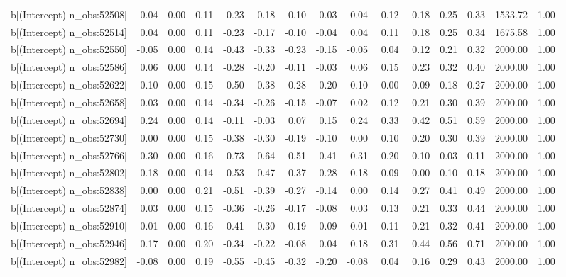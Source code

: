 \begin{table}[ht]
\begin{tabular}{rrrrrrrrrrrrrrr}
  b[(Intercept) n\_obs:52508] & 0.04 & 0.00 & 0.11 & -0.23 & -0.18 & -0.10 & -0.03 & 0.04 & 0.12 & 0.18 & 0.25 & 0.33 & 1533.72 & 1.00 \\ 
  b[(Intercept) n\_obs:52514] & 0.04 & 0.00 & 0.11 & -0.23 & -0.17 & -0.10 & -0.04 & 0.04 & 0.11 & 0.18 & 0.25 & 0.34 & 1675.58 & 1.00 \\ 
  b[(Intercept) n\_obs:52550] & -0.05 & 0.00 & 0.14 & -0.43 & -0.33 & -0.23 & -0.15 & -0.05 & 0.04 & 0.12 & 0.21 & 0.32 & 2000.00 & 1.00 \\ 
  b[(Intercept) n\_obs:52586] & 0.06 & 0.00 & 0.14 & -0.28 & -0.20 & -0.11 & -0.03 & 0.06 & 0.15 & 0.23 & 0.32 & 0.40 & 2000.00 & 1.00 \\ 
  b[(Intercept) n\_obs:52622] & -0.10 & 0.00 & 0.15 & -0.50 & -0.38 & -0.28 & -0.20 & -0.10 & -0.00 & 0.09 & 0.18 & 0.27 & 2000.00 & 1.00 \\ 
  b[(Intercept) n\_obs:52658] & 0.03 & 0.00 & 0.14 & -0.34 & -0.26 & -0.15 & -0.07 & 0.02 & 0.12 & 0.21 & 0.30 & 0.39 & 2000.00 & 1.00 \\ 
  b[(Intercept) n\_obs:52694] & 0.24 & 0.00 & 0.14 & -0.11 & -0.03 & 0.07 & 0.15 & 0.24 & 0.33 & 0.42 & 0.51 & 0.59 & 2000.00 & 1.00 \\ 
  b[(Intercept) n\_obs:52730] & 0.00 & 0.00 & 0.15 & -0.38 & -0.30 & -0.19 & -0.10 & 0.00 & 0.10 & 0.20 & 0.30 & 0.39 & 2000.00 & 1.00 \\ 
  b[(Intercept) n\_obs:52766] & -0.30 & 0.00 & 0.16 & -0.73 & -0.64 & -0.51 & -0.41 & -0.31 & -0.20 & -0.10 & 0.03 & 0.11 & 2000.00 & 1.00 \\ 
  b[(Intercept) n\_obs:52802] & -0.18 & 0.00 & 0.14 & -0.53 & -0.47 & -0.37 & -0.28 & -0.18 & -0.09 & 0.00 & 0.10 & 0.18 & 2000.00 & 1.00 \\ 
  b[(Intercept) n\_obs:52838] & 0.00 & 0.00 & 0.21 & -0.51 & -0.39 & -0.27 & -0.14 & 0.00 & 0.14 & 0.27 & 0.41 & 0.49 & 2000.00 & 1.00 \\ 
  b[(Intercept) n\_obs:52874] & 0.03 & 0.00 & 0.15 & -0.36 & -0.26 & -0.17 & -0.08 & 0.03 & 0.13 & 0.21 & 0.33 & 0.44 & 2000.00 & 1.00 \\ 
  b[(Intercept) n\_obs:52910] & 0.01 & 0.00 & 0.16 & -0.41 & -0.30 & -0.19 & -0.09 & 0.01 & 0.11 & 0.21 & 0.32 & 0.41 & 2000.00 & 1.00 \\ 
  b[(Intercept) n\_obs:52946] & 0.17 & 0.00 & 0.20 & -0.34 & -0.22 & -0.08 & 0.04 & 0.18 & 0.31 & 0.44 & 0.56 & 0.71 & 2000.00 & 1.00 \\ 
  b[(Intercept) n\_obs:52982] & -0.08 & 0.00 & 0.19 & -0.55 & -0.45 & -0.32 & -0.20 & -0.08 & 0.04 & 0.16 & 0.29 & 0.43 & 2000.00 & 1.00 \\ 

\end{tabular}
\end{table}
